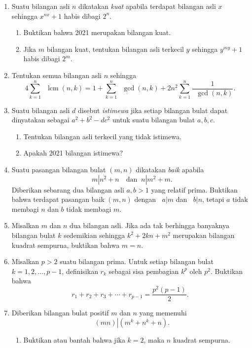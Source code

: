 \documentclass[12pt]{article}
\newcommand*\func[2]{\mathop{}\!{#1}{\left({#2}\right)}}
\newcommand*\divid[2]{\mathop{}\!{#1} \left| {#2} \right.}
\DeclareMathOperator{\lcm}{lcm}				%
\begin{document}
\begin{enumerate}[leftmargin=*]
		\item Suatu bilangan asli $ n $ dikatakan \textit{kuat} apabila terdapat bilangan asli $ x $ sehingga $ x^{nx} + 1 $ habis dibagi $ 2^{n} $.
		\begin{enumerate}
			\item Buktikan bahwa 2021 merupakan bilangan kuat.
			\item Jika $ m $ bilangan kuat, tentukan bilangan asli terkecil $ y $ sehingga $ y^{my} + 1 $ habis dibagi $ 2^{m} $.
		\end{enumerate}
		\item Tentukan semua bilangan asli $ n $ sehingga
		\[ 4\sum_{k = 1}^{n}{\func{\lcm}{n, k}} = 1 + \sum_{k = 1}^{n}{\func{\gcd}{n, k}} + 2n^{2}\sum_{k = 1}^{n}{\frac{1}{\func{\gcd}{n, k}}}. \]
		\item Suatu bilangan asli $ d $ disebut \textit{istimewa} jika setiap bilangan bulat dapat dinyatakan sebagai $ a^{2} + b^{2} - dc^{2} $ untuk suatu bilangan bulat $ a, b, c $.
		\begin{enumerate}
			\item Tentukan bilangan asli terkecil yang tidak istimewa.
			\item Apakah 2021 bilangan istimewa?
		\end{enumerate}
		\item Suatu pasangan bilangan bulat $ \left(m, n\right) $ dikatakan \textit{baik} apabila
		\[ \divid{m}{n^{2} + n} \quad \mbox{dan} \divid{n}{m^{2} + m}. \]
		Diberikan sebarang dua bilangan asli $ a, b > 1 $ yang relatif prima. Buktikan bahwa terdapat pasangan baik $ \left(m, n\right) $ dengan $ \divid{a}{m} $ dan $ \divid{b}{n} $, tetapi $ a $ tidak membagi $ n $ dan $ b $ tidak membagi $ m $.
		\item Misalkan $ m $ dan $ n $ dua bilangan asli. Jika ada tak berhingga banyaknya bilangan bulat $ k $ sedemikian sehingga $ k^{2} + 2kn + m^{2} $ merupakan bilangan kuadrat sempurna, buktikan bahwa $ m = n $.
		\item Misalkan $ p > 2 $ suatu bilangan prima. Untuk setiap bilangan bulat $ k = 1, 2, \dots, p - 1 $, definisikan $ r_{k} $ sebagai sisa pembagian $ k^{p} $ oleh $ p^{2} $. Buktikan bahwa
		\[ r_{1} + r_{2} + r_{3} + \cdots + r_{p - 1} = \frac{p^{2}\left(p - 1\right)}{2}. \]
		\item Diberikan bilangan bulat positif $ m $ dan $ n $ yang memenuhi
		\[ \divid{\left(mn\right)}{\left(m^{k} + n^{k} + n\right)}. \]
		\begin{enumerate}
			\item Buktikan atau bantah bahwa jika $ k = 2 $, maka $ n $ kuadrat sempurna.

\end{enumerate}
\end{enumerate}
\end{document}
